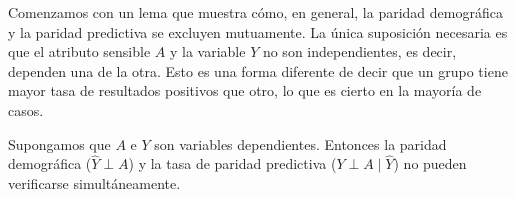 \documentclass[oneside,openright,titlepage,numbers=noenddot,openany,headinclude,footinclude=true,
cleardoublepage=empty,abstractoff,BCOR=5mm,paper=a4,fontsize=12pt,main=spanish]{scrreprt}
\begin{document}
Comenzamos con un lema que muestra cómo, en general, la paridad demográfica y la paridad predictiva se excluyen mutuamente. La única suposición necesaria es que el atributo sensible $A$ y la variable $Y$ no son independientes, es decir, dependen una de la otra. Esto es una forma diferente de decir que un grupo tiene mayor tasa de resultados positivos que otro, lo que es cierto en la mayoría de casos.

\clearpage

\begin{lemma} 
Supongamos que $A$ e $Y$ son variables dependientes. Entonces la paridad demográfica ($\hat{Y} \perp A$) y la tasa de paridad predictiva ($Y \perp A \mid \hat{Y}$) no pueden verificarse simultáneamente.
\label{lem:demopred}
\end{lemma}
\end{document}

